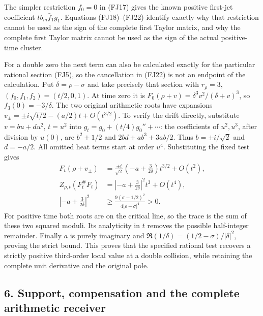 \documentclass[
  10pt,
  a4paper,
]{article}
\begin{document}
The simpler restriction \(f_0=0\) in (FJ17) gives the known positive
first-jet coefficient \(tb_m\bar f_1g_1\). Equations (FJ18)--(FJ22)
identify exactly why that restriction cannot be used as the sign of the
complete first Taylor matrix, and why the complete first Taylor matrix
cannot be used as the sign of the actual positive-time cluster.

For a double zero the next term can also be calculated exactly for the
particular rational section (FJ5), so the cancellation in (FJ22) is not
an endpoint of the calculation. Put \(\delta=\rho-\sigma\) and take
precisely that section with \(r_\rho=3\), \((f_0,f_1,f_2)=(t/2,0,1)\).
At time zero it is \(F_0(\rho+v)=\delta^3v^2/(\delta+v)^3\), so
\(f_3(0)=-3/\delta\). The two original arithmetic roots have expansions
\(v_\pm=\pm i\sqrt{t/2}-(a/2)t+O(t^{3/2})\). To verify the drift
directly, substitute \(v=bu+du^2\), \(t=u^2\) into
\(g_t=g_0+(t/4)g_0''+\cdots\): the coefficients of \(u^2,u^3\), after
division by \(u(0)\), are \(b^2+1/2\) and \(2bd+ab^3+3ab/2\). Thus
\(b=\pm i/\sqrt2\) and \(d=-a/2\). All omitted heat terms start at order
\(u^4\). Substituting the fixed test gives \[
\begin{aligned}
F_t(\rho+v_\pm)&=\frac{\pm i}{\sqrt2}
 \left(-a+\frac{3}{2\delta}\right)t^{3/2}+O(t^2),\\
Z_{\rho,t}(F_t^\#F_t)&=
 \left|-a+\frac{3}{2\delta}\right|^2t^3+O(t^4),\\
\left|-a+\frac{3}{2\delta}\right|^2
&\ge\frac{9(\sigma-1/2)^2}{4|\rho-\sigma|^4}>0.
\end{aligned}\tag{FJ22a}
\] For positive time both roots are on the critical line, so the trace
is the sum of these two squared moduli. Its analyticity in \(t\) removes
the possible half-integer remainder. Finally \(a\) is purely imaginary
and \(\Re(1/\delta)=(1/2-\sigma)/|\delta|^2\), proving the strict bound.
This proves that the specified rational test recovers a strictly
positive third-order local value at a double collision, while retaining
the complete unit derivative and the original pole.

\subsection{6. Support, compensation and the complete arithmetic
receiver}\label{support-compensation-and-the-complete-arithmetic-receiver}
\end{document}
